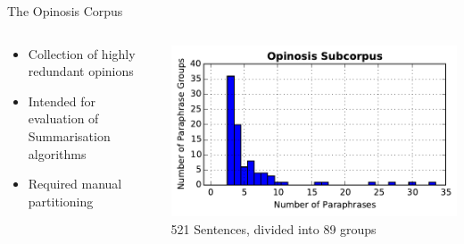 \documentclass[12pt,landscape,english]{beamer}
\begin{document}
\begin{frame}{The Opinosis Corpus}
	\begin{columns}
		\begin{column}{0.5\textwidth}
			\begin{itemize}
				\item Collection of highly redundant opinions
				\item Intended for evaluation of Summarisation algorithms
				\item Required manual partitioning
			\end{itemize}
		\end{column}
		\begin{column}{0.5\textwidth}
			\includegraphics[width=\textwidth]{opinosis_hist.pdf}\\
			521 Sentences, divided into 89 groups
		\end{column}
	\end{columns}
	
\end{frame}
\end{document}
